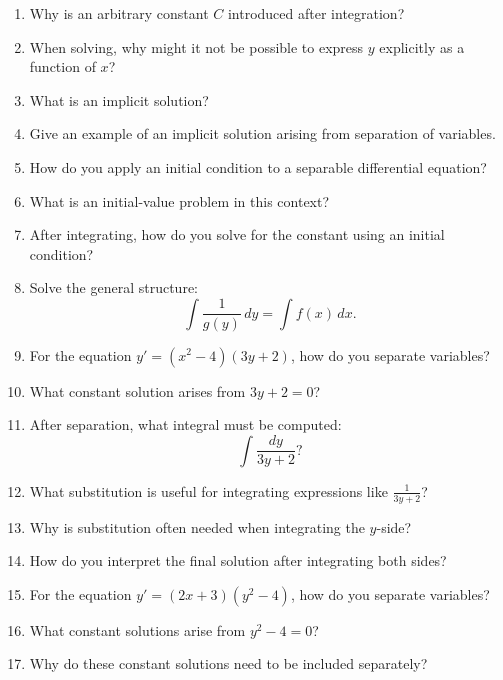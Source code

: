\begin{enumerate}
\item Why is an arbitrary constant $C$ introduced after integration?

\item When solving, why might it not be possible to express $y$ explicitly as a function of $x$?

\item What is an implicit solution?

\item Give an example of an implicit solution arising from separation of variables.

\item How do you apply an initial condition to a separable differential equation?

\item What is an initial-value problem in this context?

\item After integrating, how do you solve for the constant using an initial condition?

\item Solve the general structure:
  \[
    \int \frac{1}{g(y)}\,dy = \int f(x)\,dx.
  \]

\item For the equation $y' = (x^2 - 4)(3y+2)$, how do you separate variables?

\item What constant solution arises from $3y+2=0$?

\item After separation, what integral must be computed:
  \[
    \int \frac{dy}{3y+2}?
  \]

\item What substitution is useful for integrating expressions like $\frac{1}{3y+2}$?

\item Why is substitution often needed when integrating the $y$-side?

\item How do you interpret the final solution after integrating both sides?

\item For the equation $y' = (2x+3)(y^2 - 4)$, how do you separate variables?

\item What constant solutions arise from $y^2 - 4 = 0$?

\item Why do these constant solutions need to be included separately?


\end{enumerate}
